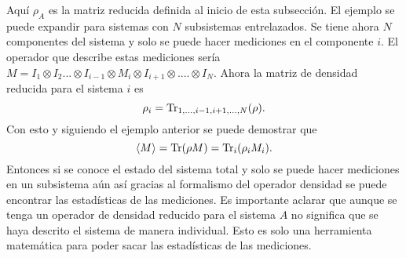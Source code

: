 Aquí $\rho_{A}$ es la matriz reducida definida al inicio de esta subsección. El ejemplo se puede expandir para sistemas con $N$ subsistemas entrelazados. Se tiene ahora $N$ componentes del sistema y solo se puede hacer mediciones en el componente $i$. El operador que describe estas mediciones sería $M= I_{1}\otimes I_{2} ... \otimes I_{i-1} \otimes M_{i} \otimes I_{i+1}\otimes .... \otimes I_{N}$. Ahora la matriz de densidad reducida para el sistema $i$ es
\begin{equation}
\rho_{i}= \Tr_{1,...,i-1,i+1,...,N}(\rho).
\end{equation}
Con esto y siguiendo el ejemplo anterior se puede demostrar que  \cite{Decoherence}
\begin{equation}
\langle M \rangle = \Tr(\rho M)=\Tr_{i}(\rho_{i} M_{i}).
\end{equation}
Entonces si se conoce el estado del sistema total y solo se puede hacer mediciones en un subsistema aún así gracias al formalismo del operador densidad se puede encontrar las estadísticas de las mediciones. Es importante aclarar que aunque se tenga un operador de densidad reducido para el sistema $A$ no significa que se haya descrito el sistema de manera individual. Esto es solo una herramienta matemática para poder sacar las estadísticas de las mediciones.
